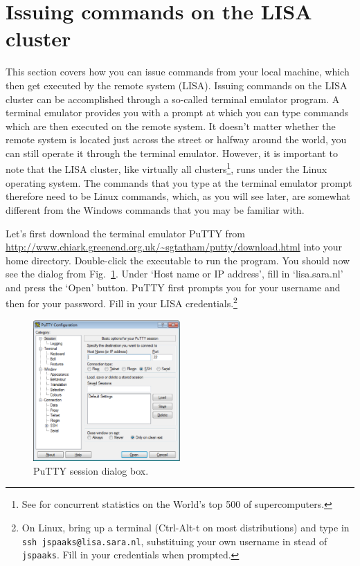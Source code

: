 \section{Issuing commands on the LISA cluster}
This section covers how you can issue commands from your local machine, which then get executed by the remote system (LISA). Issuing commands on the LISA cluster can be accomplished through a so-called terminal emulator program. A terminal emulator provides you with a prompt at which you can type commands which are then executed on the remote system. It doesn't matter whether the remote system is located just across the street or halfway around the world, you can still operate it through the terminal emulator. However, it is important to note that the LISA cluster, like virtually all clusters\footnote{See  for concurrent statistics on the World's top 500 of supercomputers.}, runs under the Linux operating system. The commands that you type at the terminal emulator prompt therefore need to be Linux commands, which, as you will see later, are somewhat different from the Windows commands that you may be familiar with.

%
Let's first download the terminal emulator PuTTY from \url{http://www.chiark.greenend.org.uk/~sgtatham/putty/download.html} into your home directory. Double-click the executable to run the program. You should now see the dialog from Fig.~\ref{fig:putty-session-dialog}. Under `Host name or IP address', fill in `lisa.sara.nl' and press the `Open' button. PuTTY first prompts you for your username and then for your password. Fill in your LISA credentials.\footnote{On Linux, bring up a terminal (Ctrl-Alt-t on most distributions) and type in \texttt{ssh jspaaks@lisa.sara.nl}, substituing your own username in stead of \texttt{jspaaks}. Fill in your credentials when prompted.}

\begin{figure}[htbp]
  \centering
    \includegraphics[width=0.5\textwidth]{./../eps/putty-session-dialog.eps}
  \caption{PuTTY session dialog box.}
  \label{fig:putty-session-dialog}
\end{figure}


